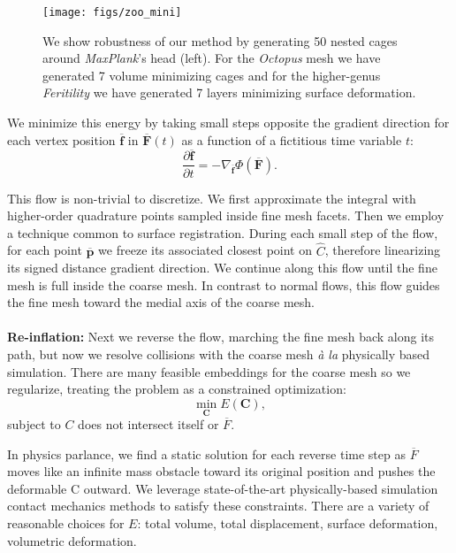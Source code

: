 \documentclass{cgyrf15}
\begin{document}

\begin{figure*}[t]
  \texttt{[image: figs/zoo\_mini]}
  \caption{We show robustness of our method by generating 50 nested cages around \emph{MaxPlank}'s head (left). For the \emph{Octopus} mesh we have generated 7 volume minimizing cages and for the higher-genus \emph{Feritility} we have generated 7 layers minimizing surface deformation. }
  \label{fig:minizoo}
\end{figure*}

We minimize this energy by taking small steps opposite the gradient 
direction for each vertex position $\overline{\mathbf{f}}$ in $\overline{\mathbf{F}}(t)$ as 
a function of a fictitious time variable $t$:
\begin{equation}
\frac{\partial \overline{\mathbf{f}}}{\partial t} = - \nabla_{\overline{\mathbf{f}}} \Phi(\overline{\mathbf{F}}).
\label{eq:energy_gradient}
\end{equation}

This flow is non-trivial to discretize. We first approximate the integral with higher-order quadrature points sampled inside fine mesh facets. Then we employ a technique common to surface registration. During each small step of the flow, for each point $\overline{\textbf{p}}$ we freeze its associated closest point on $\hat{C}$, therefore linearizing its signed distance gradient direction. We continue along this flow until the fine mesh is full inside the coarse mesh. In contrast to normal flows, this flow guides the fine mesh toward the medial axis of the coarse mesh. \\
\\
\textbf{Re-inflation:} Next we reverse the flow, marching the fine mesh back along its path, but now we resolve collisions with the coarse mesh \emph{\`{a} la} physically based simulation. There are many feasible embeddings for the coarse mesh so we regularize, treating the problem as a constrained optimization:
\begin{equation}
\min_{\mathbf{C}} E(\mathbf{C}),
\end{equation}
subject to $C$ does not intersect itself or $\overline{F}$.

In physics parlance, we find a static solution for each reverse time step as $\overline{F}$ moves like an infinite mass obstacle toward its original position and pushes the deformable C outward. We leverage state-of-the-art physically-based simulation contact mechanics methods to satisfy these constraints. There are a variety of reasonable choices for $E$: total volume, total displacement, surface deformation, volumetric deformation.
\end{document}
